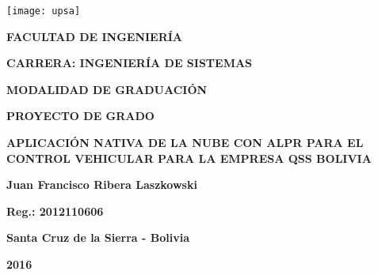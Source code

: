 {
\begin{titlepage}
     
    
    \begin{center}
        \texttt{[image: upsa]}
        
        \vspace{0.5cm}
            \large \textbf{FACULTAD DE INGENIERÍA}
            
            \textbf{CARRERA: INGENIERÍA DE SISTEMAS}
        
        \vspace{1cm}
            \textbf{MODALIDAD DE GRADUACIÓN}
            
            \textbf{PROYECTO DE GRADO}
        
        \vspace{2cm}
            \textbf{APLICACIÓN NATIVA DE LA NUBE CON ALPR PARA EL CONTROL VEHICULAR PARA LA EMPRESA QSS BOLIVIA}
        
        \vspace{3cm}
            \textbf{Juan Francisco Ribera Laszkowski}
            
            \textbf{Reg.: 2012110606}
        
        \vfill
            \textbf{Santa Cruz de la Sierra - Bolivia}
            
            \textbf{2016}
    \end{center}
\end{titlepage}
\renewcommand{\baselinestretch}{1.5} 

\restoregeometry
}